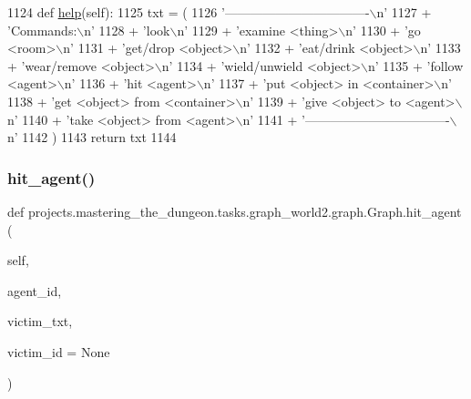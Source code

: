\begin{DoxyCode}
1124     \textcolor{keyword}{def }\hyperlink{namespaceparlai_1_1agents_1_1tfidf__retriever_1_1build__tfidf_a0e12682c80997535ca4f7f293b8c6d10}{help}(self):
1125         txt = (
1126             \textcolor{stringliteral}{'----------------------------------\(\backslash\)n'}
1127             + \textcolor{stringliteral}{'Commands:\(\backslash\)n'}
1128             + \textcolor{stringliteral}{'look\(\backslash\)n'}
1129             + \textcolor{stringliteral}{'examine <thing>\(\backslash\)n'}
1130             + \textcolor{stringliteral}{'go <room>\(\backslash\)n'}
1131             + \textcolor{stringliteral}{'get/drop <object>\(\backslash\)n'}
1132             + \textcolor{stringliteral}{'eat/drink <object>\(\backslash\)n'}
1133             + \textcolor{stringliteral}{'wear/remove <object>\(\backslash\)n'}
1134             + \textcolor{stringliteral}{'wield/unwield <object>\(\backslash\)n'}
1135             + \textcolor{stringliteral}{'follow <agent>\(\backslash\)n'}
1136             + \textcolor{stringliteral}{'hit <agent>\(\backslash\)n'}
1137             + \textcolor{stringliteral}{'put <object> in <container>\(\backslash\)n'}
1138             + \textcolor{stringliteral}{'get <object> from <container>\(\backslash\)n'}
1139             + \textcolor{stringliteral}{'give <object> to <agent>\(\backslash\)n'}
1140             + \textcolor{stringliteral}{'take <object> from <agent>\(\backslash\)n'}
1141             + \textcolor{stringliteral}{'----------------------------------\(\backslash\)n'}
1142         )
1143         \textcolor{keywordflow}{return} txt
1144 
\end{DoxyCode}
\mbox{\label{classprojects_1_1mastering__the__dungeon_1_1tasks_1_1graph__world2_1_1graph_1_1Graph_a8709bca6f375c14cbfaa578228f94fcb}} 
\subsubsection{\texorpdfstring{hit\+\_\+agent()}{hit\_agent()}}
{\footnotesize\ttfamily def projects.\+mastering\+\_\+the\+\_\+dungeon.\+tasks.\+graph\+\_\+world2.\+graph.\+Graph.\+hit\+\_\+agent (\begin{DoxyParamCaption}\item[{}]{self,  }\item[{}]{agent\+\_\+id,  }\item[{}]{victim\+\_\+txt,  }\item[{}]{victim\+\_\+id = {\ttfamily None} }\end{DoxyParamCaption})}



